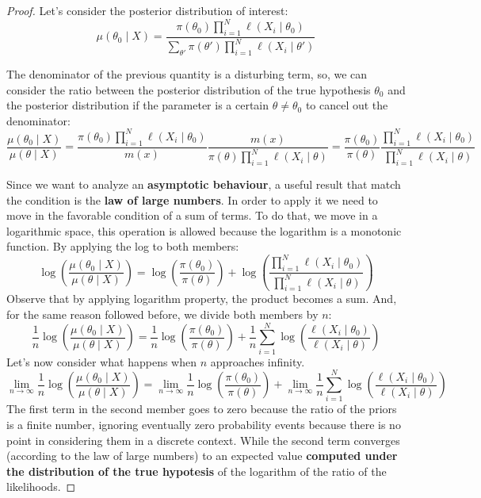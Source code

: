 \begin{proof}
    Let's consider the posterior distribution of interest:
    \[
        \mu(\theta_0 \mid X) = \frac{\pi(\theta_0) \prod_{i=1}^N \ell(X_i \mid \theta_0 )}{\sum_{\theta'} \pi(\theta') \prod_{i=1}^N \ell(X_i \mid \theta')}
    \]

    The denominator of the previous quantity is a disturbing term, so, we can consider the ratio between the posterior distribution of the true hypothesis $\theta_0$ and the posterior distribution if the parameter is a certain $\theta \neq \theta_0$ to cancel out the denominator:
    \[
        \frac{\mu(\theta_0 \mid X)}{\mu(\theta \mid X)} = \frac{\pi(\theta_0) \prod_{i=1}^N \ell(X_i \mid \theta_0 )}{m(x)} \frac{m(x)}{\pi(\theta) \prod_{i=1}^N \ell(X_i \mid \theta)} = \frac{\pi(\theta_0)}{\pi(\theta)} \frac{\prod_{i=1}^N \ell(X_i \mid \theta_0)}{\prod_{i=1}^N \ell(X_i \mid \theta)}
    \]

    Since we want to analyze an \textbf{asymptotic behaviour}, a useful result that match the condition is the \textbf{law of large numbers}. In order to apply it we need to move in the favorable condition of a sum of terms. To do that, we move in a logarithmic space, this operation is allowed because the logarithm is a monotonic function.
    By applying the log to both members:
    \[
        \log \left(\frac{\mu(\theta_0 \mid X)}{\mu(\theta \mid X)}\right) = \log \left(\frac{\pi(\theta_0)}{\pi(\theta)}\right) + \log\left(\frac{\prod_{i=1}^N \ell(X_i \mid \theta_0)}{\prod_{i=1}^N \ell(X_i \mid \theta)}\right)
    \]
    Observe that by applying logarithm property, the product becomes a sum. And, for the same reason followed before, we divide both members by $n$:
    \[
        \frac{1}{n} \log \left(\frac{\mu(\theta_0 \mid X)}{\mu(\theta \mid X)}\right) =\frac{1}{n} \log \left(\frac{\pi(\theta_0)}{\pi(\theta)}\right) + \frac{1}{n} \sum_{i=1}^N \log \left(\frac{\ell(X_i \mid \theta_0)}{ \ell(X_i \mid \theta)}\right)
    \]
    Let's now consider what happens when $n$ approaches infinity.
    \[
        \lim_{n \to \infty} \frac{1}{n} \log \left(\frac{\mu(\theta_0 \mid X)}{\mu(\theta \mid X)}\right) = \lim_{n \to \infty} \frac{1}{n} \log \left(\frac{\pi(\theta_0)}{\pi(\theta)}\right) + \lim_{n \to \infty} \frac{1}{n} \sum_{i=1}^N \log \left(\frac{\ell(X_i \mid \theta_0)}{ \ell(X_i \mid \theta)}\right)
    \]
    The first term in the second member goes to zero because the ratio of the priors is a finite number, ignoring eventually zero probability events because there is no point in considering them in a discrete context.
    While the second term converges (according to the law of large numbers) to an expected value \textbf{computed under the distribution of the true hypotesis} of the logarithm of the ratio of the likelihoods.


\end{proof}
